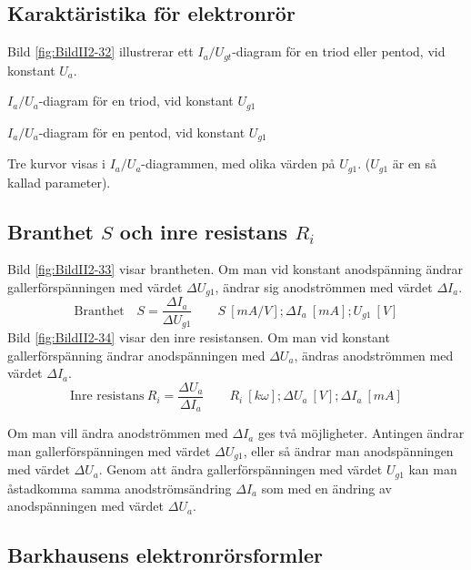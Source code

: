 \subsection{Karaktäristika för elektronrör}

Bild \ref{fig:BildII2-32} illustrerar ett \(I_a/U_{gt}\)-diagram för en triod
eller pentod, vid konstant \(U_a\).

\(I_a/U_a\)-diagram för en triod, vid konstant \(U_{g1}\)

\(I_a/U_a\)-diagram för en pentod, vid konstant \(U_{g1}\)

Tre kurvor visas i \(I_a/U_a\)-diagrammen, med olika värden på
\(U_{g1}\). (\(U_{g1}\) är en så kallad parameter).


\subsection{Branthet $S$ och inre resistans $R_i$}

Bild \ref{fig:BildII2-33} visar brantheten.
Om man vid konstant anodspänning ändrar gallerförspänningen med värdet
\(\Delta U_{g1}\), ändrar sig anodströmmen med värdet \(\Delta I_a\).
\[\text{Branthet}\quad S = \dfrac{\Delta I_a}{\Delta U_{g1}} \qquad S\ [mA/V]; \Delta I_a\ [mA]; U_{g1}\ [V]\]
Bild \ref{fig:BildII2-34} visar den inre resistansen.
Om man vid konstant gallerförspänning ändrar anodspänningen med
\(\Delta U_a\), ändras anodströmmen med värdet \(\Delta I_a\).
\[\text{Inre resistans}\ R_i = \dfrac{\Delta U_a}{\Delta I_a}\qquad R_i\ [k \omega]; \Delta U_a\ [V]; \Delta I_a\ [mA]\]

\noindent
Om man vill ändra anodströmmen med \(\Delta I_a\) ges två möjligheter.
Antingen ändrar man gallerförspänningen med värdet \(\Delta U_{g1}\), eller så
ändrar man anodspänningen med värdet \(\Delta U_a\).
Genom att ändra gallerförspänningen med värdet \(U_{g1}\) kan man åstadkomma
samma anodströmsändring \(\Delta I_a\) som med en ändring av anodspänningen
med värdet \(\Delta U_a\).

\subsection{Barkhausens elektronrörsformler}

